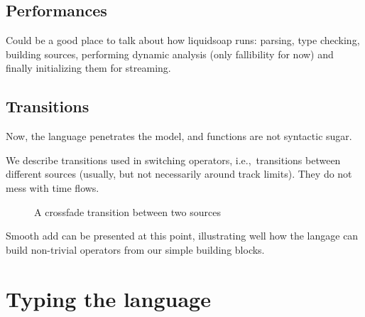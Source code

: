 \documentclass{llncs}
\newcommand{\ie}{{i.e.,}}
\begin{document}
\subsection{Performances}

Could be a good place to talk about how liquidsoap runs: parsing, type 
checking, building sources, performing dynamic analysis (only fallibility for 
now) and finally initializing them for streaming.

\subsection{Transitions}

Now, the language penetrates the model, and functions are not syntactic sugar.

We describe transitions used in switching operators, \ie\ transitions between
different sources (usually, but not necessarily around track limits).
They do not mess with time flows.

\begin{figure}[t]
 \begin{center}
\end{center}
 \caption{A crossfade transition between two sources}
 \label{cross-fig}
\end{figure}

Smooth add can be presented at this point,
illustrating well how the langage can build non-trivial operators from
our simple building blocks.

\section{Typing the language}
\end{document}
